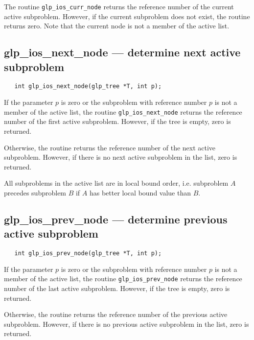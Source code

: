 The routine \verb|glp_ios_curr_node| returns the reference number of
the current active subproblem. However, if the current subproblem does
not exist, the routine returns zero. Note that the current node is not
a member of the active list.

\subsection{glp\_ios\_next\_node --- determine next active subproblem}

\synopsis

\begin{verbatim}
   int glp_ios_next_node(glp_tree *T, int p);
\end{verbatim}

\returns

If the parameter $p$ is zero or the subproblem with reference number $p$
is not a member of the active list, the routine \verb|glp_ios_next_node|
returns the reference number of the first active subproblem. However, if
the tree is empty, zero is returned.

Otherwise, the routine returns the reference number of the next active
subproblem. However, if there is no next active subproblem in the list,
zero is returned.

All subproblems in the active list are in local bound order, i.e.
subproblem $A$ precedes subproblem $B$ if $A$ has better local bound
value than $B$.

\newpage

\subsection{glp\_ios\_prev\_node --- determine previous active
subproblem}

\synopsis

\begin{verbatim}
   int glp_ios_prev_node(glp_tree *T, int p);
\end{verbatim}

\returns

If the parameter $p$ is zero or the subproblem with reference number $p$
is not a member of the active list, the routine \verb|glp_ios_prev_node|
returns the reference number of the last active subproblem. However, if
the tree is empty, zero is returned.

Otherwise, the routine returns the reference number of the previous
active subproblem. However, if there is no previous active subproblem in
the list, zero is returned.

